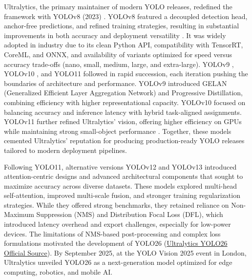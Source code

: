 \documentclass{article}
\begin{document}
Ultralytics, the primary maintainer of modern YOLO releases, redefined the framework with YOLOv8 (2023) \cite{sohan2024review}. YOLOv8 featured a decoupled detection head, anchor-free predictions, and refined training strategies, resulting in substantial improvements in both accuracy and deployment versatility \cite{farooq2024improved}. It was widely adopted in industry due to its clean Python API, compatibility with TensorRT, CoreML, and ONNX, and availability of variants optimized for speed versus accuracy trade-offs (nano, small, medium, large, and extra-large). YOLOv9 \cite{wang2024yolov9}, YOLOv10 \cite{wang2024yolov10}, and YOLO11 followed in rapid succession, each iteration pushing the boundaries of architecture and performance. YOLOv9 introduced GELAN (Generalized Efficient Layer Aggregation Network) and Progressive Distillation, combining efficiency with higher representational capacity. YOLOv10 focused on balancing accuracy and inference latency with hybrid task-aligned assignments. YOLOv11 further refined Ultralytics’ vision, offering higher efficiency on GPUs while maintaining strong small-object performance \cite{sapkota2025yolo}. Together, these models cemented Ultralytics’ reputation for producing production-ready YOLO releases tailored to modern deployment pipelines.

Following YOLO11, alternative versions YOLOv12\cite{tian2025yolov12} and YOLOv13 \cite{lei2025yolov13} introduced attention-centric designs and advanced architectural components that sought to maximize accuracy across diverse datasets. These models explored multi-head self-attention, improved multi-scale fusion, and stronger training regularization strategies. While they offered strong benchmarks, they retained reliance on Non-Maximum Suppression (NMS) and Distribution Focal Loss (DFL), which introduced latency overhead and export challenges, especially for low-power devices. The limitations of NMS-based post-processing and complex loss formulations motivated the development of YOLO26  (\href{https://docs.ultralytics.com/models/yolo26/}{Ultralytics YOLO26 Official Source}). By September 2025, at the YOLO Vision 2025 event in London, Ultralytics unveiled YOLO26 as a next-generation model optimized for edge computing, robotics, and mobile AI. 
\end{document}
